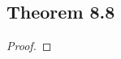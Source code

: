 \documentclass[../../main.tex]{subfiles}
\begin{document}
\subsection{Theorem 8.8}
\begin{wts}

\end{wts}
\begin{proof}

\end{proof}
\end{document}

